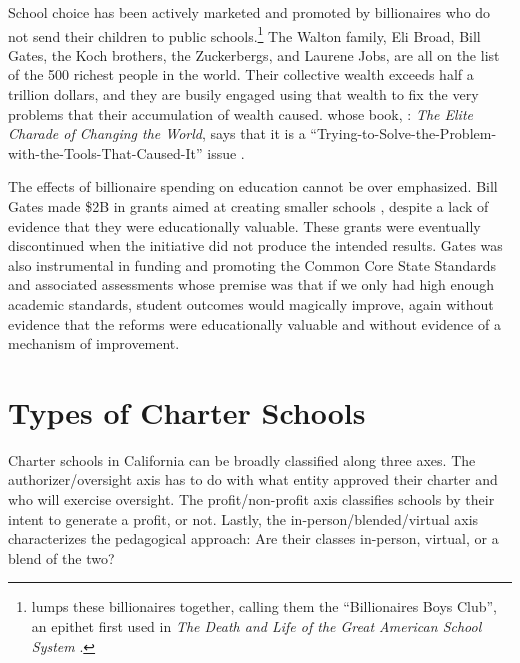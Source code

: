 School choice has been actively marketed and promoted by billionaires who do not send their children to public schools.\footnote{\citeauthor{Ravitch2016} lumps these billionaires together, calling them the ``Billionaires  Boys Club'', an epithet first used in \textit{The Death and Life of the Great American School System} \parencite{Ravitch2016}.} The Walton family, Eli Broad, Bill Gates, the Koch brothers, the Zuckerbergs, and Laurene Jobs, are all on the list of the 500 richest people in the world. Their collective wealth exceeds half a trillion dollars, and they are busily engaged using that wealth to fix the very problems that their accumulation of wealth caused. \textcite{Giridharadas2018} whose book, : \textit{The Elite Charade of Changing the World}, says that it is a ``Trying-to-Solve-the-Problem-with-the-Tools-That-Caused-It'' issue \parencite[142]{Giridharadas2018}.

The effects of billionaire spending on education cannot be over emphasized. Bill Gates made \$2B in grants aimed at creating smaller schools \parencite[11]{Gates2009}, despite a lack of evidence that they were educationally valuable. These grants were eventually discontinued when the initiative did not produce the intended results. Gates was also instrumental in funding and promoting the Common Core State Standards and associated assessments whose premise was that if we only had high enough academic standards, student outcomes would magically improve, again without evidence that the reforms were educationally valuable and without evidence of a mechanism of improvement.

\section{Types of Charter Schools}\label{sec:types-charters}\indent

Charter schools in California can be broadly classified along three axes. The authorizer/oversight axis has to do with what entity approved their charter and who will exercise oversight. The profit/non-profit axis classifies schools by their intent to generate a profit, or not. Lastly, the in-person/blended/virtual axis characterizes the pedagogical approach: Are their classes in-person, virtual, or a blend of the two?

